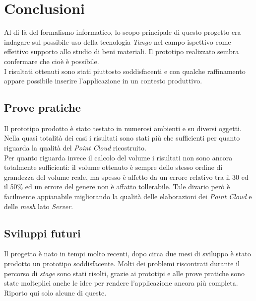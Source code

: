 
\chapter{Conclusioni}
\label{cap:conclusioni}
Al di là del formalismo informatico, lo scopo principale di questo progetto era indagare sul possibile uso della tecnologia \emph{Tango} nel campo ispettivo come effettivo supporto allo studio di beni materiali. Il prototipo realizzato sembra confermare che cioè è possibile.\\
I risultati ottenuti sono stati piuttosto soddisfacenti e con qualche raffinamento appare possibile inserire l'applicazione in un contesto produttivo.

\section{Prove pratiche}
Il prototipo prodotto è stato testato in numerosi ambienti e su diversi oggetti. Nella quasi totalità dei casi i risultati sono stati più che sufficienti per quanto riguarda la qualità del \emph{Point Cloud} ricostruito.\\
Per quanto riguarda invece il calcolo del volume i risultati non sono ancora totalmente sufficienti: il volume ottenuto è sempre dello stesso ordine di grandezza del volume reale, ma spesso è affetto da un errore relativo tra il 30 ed il 50\% ed un errore del genere non è affatto tollerabile. Tale divario però è facilmente appianabile migliorando la qualità delle elaborazioni dei \emph{Point Cloud} e delle \emph{mesh} lato \emph{Server}.

\section{Sviluppi futuri}
Il progetto è nato in tempi molto recenti, dopo circa due mesi di sviluppo è stato prodotto un prototipo soddisfacente. Molti dei problemi riscontrati durante il percorso di \emph{stage} sono stati risolti, grazie ai prototipi e alle prove pratiche sono state molteplici anche le idee per rendere l'applicazione ancora più completa. Riporto qui solo alcune di queste.

